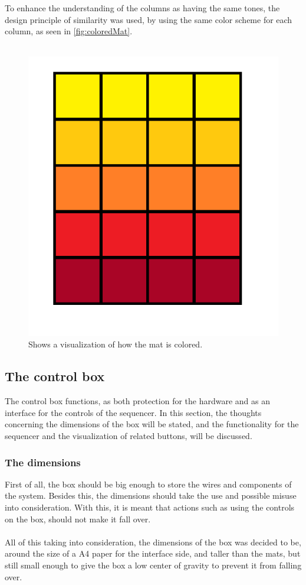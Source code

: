 To enhance the understanding of the columns as having the same tones, the design principle of similarity\cite{gestalt} was used, by using the same color scheme for each column, as seen in \autoref{fig:coloredMat}.\\\\

\begin{figure}[H]
	\centering
	\includegraphics[width=0.5\linewidth]{figure/Design/coloredMat}
	\caption{Shows a visualization of how the mat is colored.}	
	\label{fig:coloredMat}
 \end{figure}

\subsection{The control box}
The control box functions, as both protection for the hardware and as an interface for the controls of the sequencer. In this section, the thoughts concerning the dimensions of the box will be stated, and the functionality for the sequencer and the visualization of related buttons, will be discussed.

\subsubsection{The dimensions}
First of all, the box should be big enough to store the wires and components of the system. Besides this, the dimensions should take the use and possible misuse into consideration. With this, it is meant that actions such as using the controls on the box, should not make it fall over.\\\\
All of this taking into consideration, the dimensions of the box was decided to be, around the size of a A4 paper for the interface side, and taller than the mats, but still small enough to give the box a low center of gravity to prevent it from falling over.

